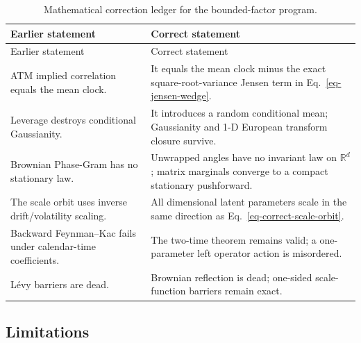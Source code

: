 \documentclass[
  english,
  11pt,
  letterpaper,
  DIV=11,
  numbers=noendperiod]{scrartcl}
\theoremstyle{plain}
\theoremstyle{plain}
\theoremstyle{plain}
\theoremstyle{plain}
\theoremstyle{remark}
\begin{document}
\begin{longtable}[]{@{}
  >{\raggedright\arraybackslash}p{}
  >{\raggedright\arraybackslash}p{}@{}}
\caption{Mathematical correction ledger for the bounded-factor
program.}\label{tbl-corrections}\tabularnewline
\toprule\noalign{}
\begin{minipage}[b]{\linewidth}\raggedright
Earlier statement
\end{minipage} & \begin{minipage}[b]{\linewidth}\raggedright
Correct statement
\end{minipage} \\
\midrule\noalign{}
\endfirsthead
\toprule\noalign{}
\begin{minipage}[b]{\linewidth}\raggedright
Earlier statement
\end{minipage} & \begin{minipage}[b]{\linewidth}\raggedright
Correct statement
\end{minipage} \\
\midrule\noalign{}
\endhead
\bottomrule\noalign{}
\endlastfoot
ATM implied correlation equals the mean clock. & It equals the mean
clock minus the exact square-root-variance Jensen term in
Eq.~\ref{eq-jensen-wedge}. \\
Leverage destroys conditional Gaussianity. & It introduces a random
conditional mean; Gaussianity and 1-D European transform closure
survive. \\
Brownian Phase-Gram has no stationary law. & Unwrapped angles have no
invariant law on \(\mathbb R^d\); matrix marginals converge to a compact
stationary pushforward. \\
The scale orbit uses inverse drift/volatility scaling. & All dimensional
latent parameters scale in the same direction as
Eq.~\ref{eq-correct-scale-orbit}. \\
Backward Feynman--Kac fails under calendar-time coefficients. & The
two-time theorem remains valid; a one-parameter left operator action is
misordered. \\
Lévy barriers are dead. & Brownian reflection is dead; one-sided
scale-function barriers remain exact. \\
\end{longtable}

\subsection{Limitations}\label{limitations}
\end{document}
